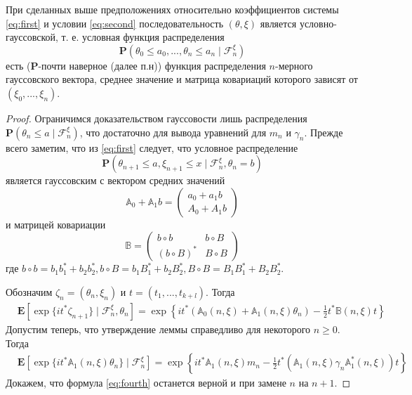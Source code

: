 \begin{lemma}
	При сделанных выше предположениях относительно коэффициентов системы \eqref{eq:first} и условии \eqref{eq:second} последовательность $(\theta, \xi)$ является условно-гауссовской, т. е. условная функция распределения
	$$\mathbf{P}(\theta_0 \leqslant a_0, ..., \theta_n \leqslant a_n \mid \mathscr{F}^{\xi}_n)$$
	есть (\textbf{P}-почти наверное (далее п.н)) функция распределения $n$-мерного гауссовского вектора, среднее значение и матрица ковариаций которого зависят от
	$(\xi_0, ..., \xi_n)$.
\end{lemma}
\begin{proof}
	Ограничимся доказательством гауссовости лишь распределения $\mathbf{P}(\theta_n \leqslant a \mid \mathscr{F}^{\xi}_n)$, что достаточно для вывода уравнений для $m_n$ и $\gamma_n$. Прежде всего заметим, что из \eqref{eq:first} следует, что условное распределение
	$$\mathbf{P}(\theta_{n + 1} \leqslant a, \xi_{n + 1} \leqslant x \mid \mathscr{F}^{\xi}_n, \theta_n = b)$$
	является гауссовским с вектором средних значений
	$$\mathbb{A}_0 + \mathbb{A}_1 b = 
	\begin{pmatrix}
	a_0 + a_1 b\\
	A_0 + A_1 b
	\end{pmatrix}$$
	и матрицей ковариации
	$$\mathbb{B} = 
	\begin{pmatrix}
	b \circ b & b \circ B\\
	(b \circ B)^* & B \circ B
	\end{pmatrix}$$
	где $b \circ b = b_1 b_1^* + b_2 b_2^*, b \circ B = b_1 B_1^* + b_2 B_2^*, B \circ B = B_1 B_1^* + B_2 B_2^*$.
	
	Обозначим $\zeta_n = (\theta_n, \xi_n)$ и $t = (t_1, ..., t_{k+l})$. Тогда
	\begin{align}
	\label{eq:third}
	& \mathbf{E} \left[ \exp\{ it^*\zeta_{n + 1}\} \mid \mathscr{F}^\xi_n, \theta_n\right] = \exp \left\{ it^* \left( \mathbb{A}_0(n, \xi) + \mathbb{A}_1(n, \xi)\theta_n\right) - \frac{1}{2} t^* \mathbb{B}(n, \xi)t\right\}
	\end{align}
	Допустим теперь, что утверждение леммы справедливо для некоторого $n \geqslant 0$. Тогда
	\begin{align}
	\label{eq:fourth}
	& \mathbf{E} \left[ \exp\{ it^*\mathbb{A}_1(n, \xi)\theta_n\} \mid \mathscr{F}^\xi_n\right] = \exp \left\{ it^* \mathbb{A}_1(n, \xi)m_n - \frac{1}{2} t^* \left(\mathbb{A}_1(n, \xi)\gamma_n \mathbb{A}_1^*(n, \xi) \right) t\right\}
	\end{align}
	Докажем, что формула \eqref{eq:fourth} останется верной и при замене $n$ на $n + 1$.
	

\end{proof}
